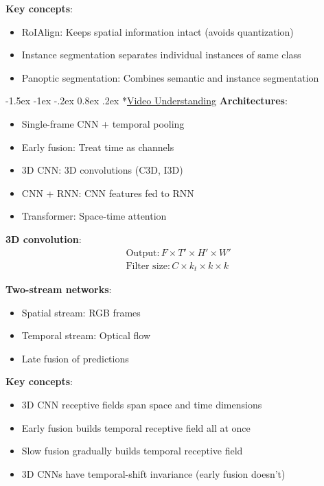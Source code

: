 \documentclass{article}
\makeatletter
\renewcommand\section{\@startsection{section}{1}{\z@}%
                                  {-1.5ex \@plus -1ex \@minus -.2ex}%
                                  {0.8ex \@plus.2ex}%
                                  {\normalfont\small\bfseries}}
\makeatother
\begin{document}
\begin{multicols}{3}
\textbf{Key concepts}:
\begin{itemize}
\item RoIAlign: Keeps spatial information intact (avoids quantization)
\item Instance segmentation separates individual instances of same class
\item Panoptic segmentation: Combines semantic and instance segmentation
\end{itemize}

\section*{\underline{Video Understanding}}
\textbf{Architectures}:
\begin{itemize}
\item Single-frame CNN + temporal pooling
\item Early fusion: Treat time as channels
\item 3D CNN: 3D convolutions (C3D, I3D)
\item CNN + RNN: CNN features fed to RNN
\item Transformer: Space-time attention
\end{itemize}

\textbf{3D convolution}: 
\begin{align*}
\text{Output}: F \times T' \times H' \times W'\\
\text{Filter size}: C \times k_t \times k \times k
\end{align*}

\textbf{Two-stream networks}:
\begin{itemize}
\item Spatial stream: RGB frames
\item Temporal stream: Optical flow
\item Late fusion of predictions
\end{itemize}

\textbf{Key concepts}:
\begin{itemize}
\item 3D CNN receptive fields span space and time dimensions
\item Early fusion builds temporal receptive field all at once
\item Slow fusion gradually builds temporal receptive field
\item 3D CNNs have temporal-shift invariance (early fusion doesn't)
\end{itemize}


\end{multicols}
\end{document}
